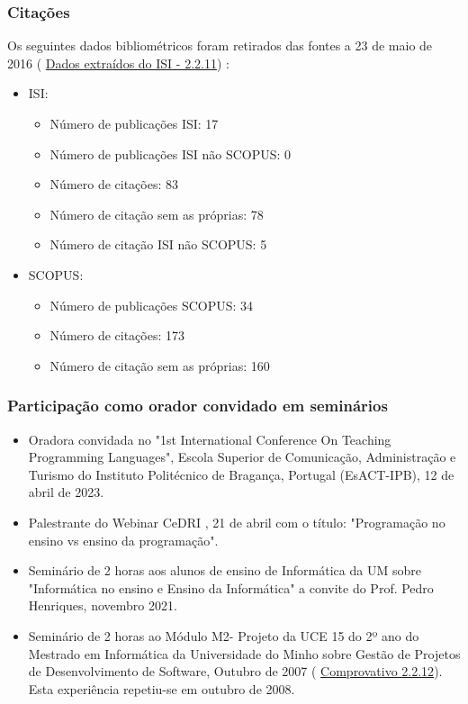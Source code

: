 \documentclass[11pt]{article}
\begin{document}
\subsubsection{Citações}Os seguintes dados bibliométricos foram retirados das fontes a 23 de maio de 2016 (
\href{run:Publicacoes/citacoesISI.pdf}{Dados extraídos do ISI - 2.2.11}) :
\begin{itemize}
\item{ISI:}
\begin{itemize}
\item{Número de publicações ISI: 17}
\item{Número de publicações ISI não SCOPUS: 0}
\item{Número de citações: 83}
\item{Número de citação sem as próprias: 78}
\item{Número de citação ISI não SCOPUS: 5}
\end{itemize}
\item{SCOPUS:}
\begin{itemize}
\item{Número de publicações SCOPUS: 34}
\item{Número de citações: 173}
\item{Número de citação sem as próprias: 160}
\end{itemize}
\end{itemize}
\subsubsection{Participação como orador convidado em seminários}
\begin{itemize}
\item{Oradora convidada no "1st International Conference On Teaching Programming Languages", Escola Superior de Comunicação, Administração e Turismo do Instituto Politécnico de Bragança, Portugal (EsACT-IPB), 12 de abril de 2023.}
\item{Palestrante do Webinar CeDRI , 21 de abril com o título: "Programação no ensino vs ensino da programação".}
\item{Seminário de 2 horas aos alunos de ensino de Informática da UM sobre "Informática no ensino e Ensino da Informática" a convite do Prof. Pedro Henriques, novembro 2021.}
\item{Seminário de 2 horas ao Módulo M2- Projeto da UCE 15 do 2º ano do Mestrado em Informática da Universidade do Minho sobre Gestão de Projetos de Desenvolvimento de Software, Outubro de 2007 (
\href{run:MissaoIPBoutros/comunicacaooralUM.pdf}{Comprovativo 2.2.12}). Esta experiência repetiu-se em outubro de 2008.}
\end{itemize}
\end{document}
